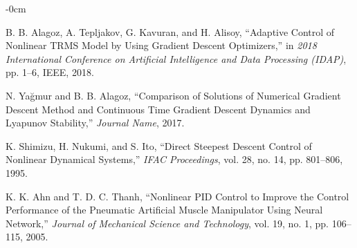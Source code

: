 \documentclass[journal,article,submit,pdftex,moreauthors]{Definitions/mdpi}
\begin{document}
\begin{adjustwidth}{-\extralength}{0cm}
{\begin{thebibliography}{999}
B. B. Alagoz, A. Tepljakov, G. Kavuran, and H. Alisoy, ``Adaptive Control of Nonlinear TRMS Model by Using Gradient Descent Optimizers,'' in \emph{2018 International Conference on Artificial Intelligence and Data Processing (IDAP)}, pp. 1--6, IEEE, 2018.

N. Yağmur and B. B. Alagoz, ``Comparison of Solutions of Numerical Gradient Descent Method and Continuous Time Gradient Descent Dynamics and Lyapunov Stability,'' \emph{Journal Name}, 2017.

K. Shimizu, H. Nukumi, and S. Ito, ``Direct Steepest Descent Control of Nonlinear Dynamical Systems,'' \emph{IFAC Proceedings}, vol. 28, no. 14, pp. 801--806, 1995.

K. K. Ahn and T. D. C. Thanh, ``Nonlinear PID Control to Improve the Control Performance of the Pneumatic Artificial Muscle Manipulator Using Neural Network,'' \emph{Journal of Mechanical Science and Technology}, vol. 19, no. 1, pp. 106--115, 2005.

\end{thebibliography}
}



\end{adjustwidth}
\end{document}
